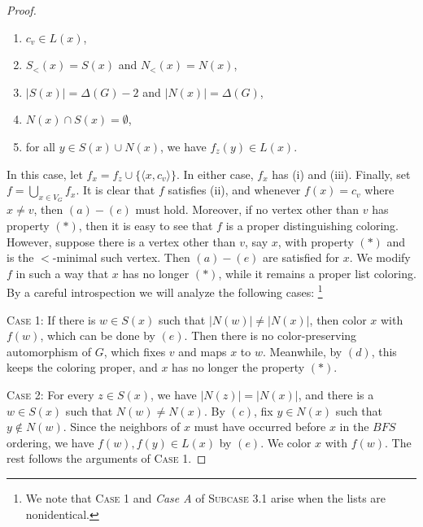 \documentclass[10pt,a4paper]{amsart}
\begin{document}
\begin{proof}
\begin{enumerate}
    \item[$(a)$] $c_v\in L(x)$,
    \item[$(b)$] $S_<(x)=S(x)$ and $N_<(x)=N(x)$,
    \item[$(c)$] $|S(x)| = \Delta(G) -2$ and $|N(x)| = \Delta(G)$,
    \item[$(d)$] $N(x) \cap S(x) = \emptyset$,
    \item[$(e)$] for all $y\in S(x) \cup N(x)$, we have $f_z(y)\in L(x)$.
\end{enumerate}
In this case, let $f_x = f_z\cup \{\langle x, c_v \rangle\}$.
In either case, $f_x$ has (i) and (iii). 
Finally, set $f=\bigcup_{x\in V_{G}}f_x$. It is clear that $f$ satisfies (ii), and whenever $f(x)=c_v$ where $x\neq v$, then $(a)-(e)$ must hold. Moreover, if no vertex other than $v$ has property $(\ast)$, then it is easy to see that $f$ is a proper distinguishing coloring. 
However, suppose there is a vertex other than $v$, say $x$, with property $(\ast)$ and is the $<$-minimal such vertex. Then $(a)-(e)$ are satisfied for $x$. We modify $f$ in such a way that $x$ has no longer $(\ast)$, while it remains a proper list coloring.
By a careful introspection we will analyze the following cases: \footnote{We note that \textsc{Case 1} and {\em Case A} of \textsc{Subcase 3.1} arise when the lists are nonidentical.}

\noindent \textsc{Case 1:} If there is $w\in S(x)$ such that $|N(w)| \neq |N(x)|$, then color $x$ with $f(w)$,
which can be done by $(e)$. Then there is no color-preserving automorphism of $G$, which fixes $v$ and maps $x$ to $w$. Meanwhile, by $(d)$, this keeps the coloring proper, and $x$ has no longer the property $(\ast)$.


\noindent \textsc{Case 2:} For every $z\in S(x)$, we have $|N(z)| = |N(x)|$, and there is a $w\in S(x)$ such that $N(w)\neq N(x)$. By $(c)$, fix $y\in N(x)$ such that $y\not\in N(w)$. Since the neighbors of $x$ must have occurred before $x$ in the $BFS$ ordering, we have $f(w), f(y)\in L(x)$ by $(e)$.
We color $x$ with $f(w)$. The rest follows the arguments of \textsc{Case 1}.


\end{proof}
\end{document}
